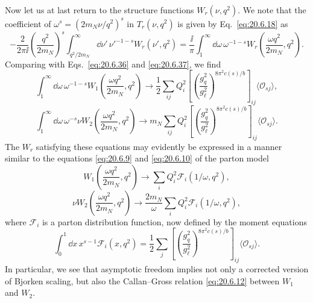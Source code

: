 Now let us at last return to the structure functions $W_r(\nu,q^2)$. We note that the coefficient of $\omega^s=(2m_N\nu/q^2)^s$ in $T_r(\nu,q^2)$ is given by Eq.~\eqref{eq:20.6.18} as
\[
-\frac{2}{2\pi \ii}
\left(\frac{q^2}{2m_N}\right)^s
\int_{q^2/2m_N}^{\infty}\dd\nu'\,
\nu'^{-1-s}W_r(\nu',q^2)
=\frac{\ii}{\pi}\int_1^\infty \dd\omega\,
\omega^{-1-s}
W_r\left(\frac{\omega q^2}{2m_N},q^2\right).
\]
Comparing with Eqs.~\eqref{eq:20.6.36} and \eqref{eq:20.6.37}, we find
\begin{equation}
\int_1^\infty \dd\omega\,\omega^{-1-s}
W_1\left(\frac{\omega q^2}{2m_N},q^2\right)
\longrightarrow
\frac12\sum_{ij}Q_i^2
\left[
\left(\frac{g_q^2}{g_\ell^2}\right)^{8\pi^2c(s)/b}
\right]_{ij}
\langle\mathcal O_{sj}\rangle,
\tag{20.6.38}\label{eq:20.6.38}
\end{equation}
\begin{equation}
\int_1^\infty \dd\omega\,\omega^{-s}\nu
W_2\left(\frac{\omega q^2}{2m_N},q^2\right)
\longrightarrow
m_N\sum_{ij}Q_i^2
\left[
\left(\frac{g_q^2}{g_\ell^2}\right)^{8\pi^2c(s)/b}
\right]_{ij}
\langle\mathcal O_{sj}\rangle.
\tag{20.6.39}\label{eq:20.6.39}
\end{equation}
The $W_r$ satisfying these equations may evidently be expressed in a manner similar to the equations \eqref{eq:20.6.9} and \eqref{eq:20.6.10} of the parton model
\begin{equation}
W_1\left(\frac{\omega q^2}{2m_N},q^2\right)
\longrightarrow
\sum_iQ_i^2\mathcal F_i(1/\omega,q^2),
\tag{20.6.40}\label{eq:20.6.40}
\end{equation}
\begin{equation}
\nu W_2\left(\frac{\omega q^2}{2m_N},q^2\right)
\longrightarrow
\frac{2m_N}{\omega}
\sum_iQ_i^2\mathcal F_i(1/\omega,q^2),
\tag{20.6.41}\label{eq:20.6.41}
\end{equation}
where $\mathcal F_i$ is a parton distribution function, now defined by the moment equations
\begin{equation}
\int_0^1\dd x\,x^{s-1}\mathcal F_i(x,q^2)
=\frac12\sum_j
\left[
\left(\frac{g_q^2}{g_\ell^2}\right)^{8\pi^2c(s)/b}
\right]_{ij}
\langle\mathcal O_{sj}\rangle.
\tag{20.6.42}\label{eq:20.6.42}
\end{equation}
In particular, we see that asymptotic freedom implies not only a corrected version of Bjorken scaling, but also the Callan--Gross relation \eqref{eq:20.6.12} between $W_1$ and $W_2$.

